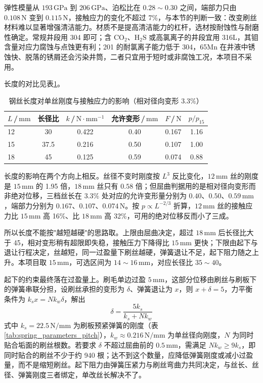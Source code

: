 弹性模量从 $193\,\mathrm{GPa}$ 到 $206\,\mathrm{GPa}$、泊松比在 $0.28\sim0.30$ 之间，端部力只由 $0.108\,\mathrm{N}$ 变到 $0.115\,\mathrm{N}$，接触应力的变化不超过 7\%，与本节的判断一致：改变刷丝材料难以显著增强清洁能力。材质不是提高清洁能力的杠杆，选材按耐蚀性与耐磨性确定。常规井段用 304 即可；含 $\mathrm{CO_{2}}$、$\mathrm{H_{2}S}$ 或高氯离子的井段宜用 316L，其钼含量对应力腐蚀与点蚀更有利；201 的耐氯离子能力低于 304，65Mn 在井液中锈蚀快、脱落的锈屑还会污染井筒，二者只宜用于短时或非腐蚀工况，本项目不采用。

长度的对比见表\ref{tab:brush_length_compare}。

\begin{table}[H]
	\centering
	\caption{钢丝长度对单丝刚度与接触应力的影响（相对径向变形 $3.3\%$）}
	\label{tab:brush_length_compare}
	\renewcommand{\arraystretch}{1.3}
	\begin{tabular}{lccccc}
		\toprule
		$L$\,/\,$\mathrm{mm}$ & 长径比 & $k$\,/\,$\mathrm{N\cdot mm^{-1}}$ & 允许变形\,/\,$\mathrm{mm}$ & $F$\,/\,$\mathrm{N}$ & $p/p_{15}$ \\
		\midrule
		12 & 30 & 0.422 & 0.40 & 0.167 & 1.16 \\
		15 & 37.5 & 0.216 & 0.50 & 0.107 & 1.00 \\
		18 & 45 & 0.125 & 0.59 & 0.074 & 0.88 \\
		\bottomrule
	\end{tabular}
\end{table}

长度的影响在两个方向上相反。丝径不变时刚度按 $L^{3}$ 反比变化，$12\,\mathrm{mm}$ 丝的刚度是 $15\,\mathrm{mm}$ 的 1.95 倍，$18\,\mathrm{mm}$ 丝只有 $0.58$ 倍；但屈曲判据用的是相对径向变形而非绝对位移，三档丝长在 $3.3\%$ 处对应的允许变形量分别为 $0.40$、$0.50$、$0.59\,\mathrm{mm}$，端部力分别为 $0.167$、$0.107$、$0.074\,\mathrm{N}$。按 $p\propto L^{-2/3}$ 折算，$12\,\mathrm{mm}$ 丝的接触应力比 $15\,\mathrm{mm}$ 高 16\%、比 $18\,\mathrm{mm}$ 高 32\%，可用的绝对位移反而小了三成。

所以长度不能按"越短越硬"的思路取。上限由屈曲决定，超过 $18\,\mathrm{mm}$ 后长径比大于 45，相对变形稍有超限即失稳，接触压力下降得比 $15\,\mathrm{mm}$ 更快；下限由起下与退让行程决定，丝越短，同一过盈量下刷丝越硬，弹簧退让不足，起下阻力随之上升。本项目取 $15\,\mathrm{mm}$，可选区间为 $14\sim16\,\mathrm{mm}$，对应长径比 $35\sim40$。

起下的约束最终落在过盈量上。刷毛单边过盈 $5\,\mathrm{mm}$，这部分位移由刷丝与刷板下的弹簧串联分担，设刷丝承担的变形为 $\delta$、弹簧退让为 $x$，则 $x+\delta=5$，力平衡条件为 $k_{s}x=Nk_{w}\delta$，解出
\begin{equation}
\delta=\frac{5k_{s}}{k_{s}+Nk_{w}}
\label{eq:brush_clearance_split}
\end{equation}
式中 $k_{s}=22.5\,\mathrm{N/mm}$ 为刷板预紧弹簧的刚度（表\ref{tab:spring_parameters_pitch}），$k_{w}\approx0.216\,\mathrm{N/mm}$ 为单丝径向刚度，$N$ 为同时贴合垢面的刷丝根数。若要求 $\delta$ 不超过屈曲前的 $0.5\,\mathrm{mm}$，需满足 $Nk_{w}\ge9k_{s}$，即同时贴合的刷丝不少于约 940 根；达不到这个数量，应降低弹簧刚度或减小过盈量，而不是缩短刷丝。起下阻力由弹簧压紧力与刷丝弯曲力共同决定，与丝长、丝径、弹簧刚度三者绑定，单改丝长解决不了。

